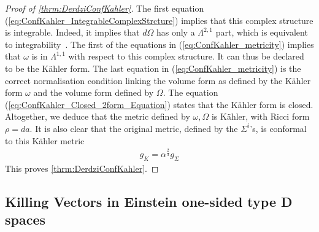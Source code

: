 \documentclass[10pt]{report}
\theoremstyle{definition}
\begin{document}
\begin{proof}[Proof of \cref{thrm:DerdziConfKahler}]
    The first equation (\ref{eq:ConfKahler_IntegrableComplexStrcture}) implies that this complex structure is integrable. Indeed, it implies that $d\Omega$ has only a $\Lambda^{2,1}$ part, which is equivalent to integrability~\cite{Besse1987}. The first of the equations in (\ref{eq:ConfKahler_metricity}) implies that $\omega$ is in $\Lambda^{1,1}$ with respect to this complex structure. It can thus be declared to be the K\"ahler form. The last equation in  (\ref{eq:ConfKahler_metricity}) is the correct normalisation condition linking the volume form as defined by the K\"ahler form $\omega$ and the volume form defined by $\Omega$. The equation (\ref{eq:ConfKahler_Closed_2form_Equation}) states that the K\"ahler form is closed. Altogether, we deduce that the metric defined by $\omega,\Omega$ is K\"ahler, with Ricci form $\rho = da$. It is also clear that the original metric, defined by the $\Sigma^i$'s, is conformal to this K\"ahler metric 
    \begin{align}
        g_K = \alpha^\frac{2}{3} g_\Sigma
    \end{align}
    This proves \cref{thrm:DerdziConfKahler}. 
\end{proof}

\subsection{Killing Vectors in Einstein one-sided type D spaces}
\end{document}
